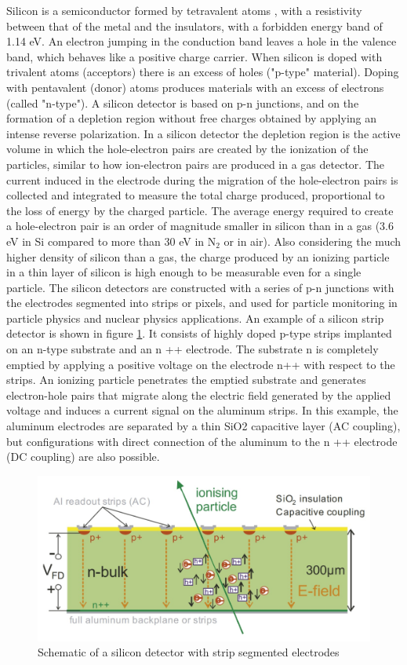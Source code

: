 \noindent Silicon is a semiconductor formed by tetravalent atoms \cite{detector}, with a resistivity between that of the metal and the insulators, with a forbidden energy band of 1.14 eV.
An electron jumping in the conduction band leaves a hole in the valence band, which behaves like a positive charge carrier.
When silicon is doped with trivalent atoms (acceptors) there is an excess of holes ("p-type" material).
Doping with pentavalent (donor) atoms produces materials with an excess of electrons (called "n-type").
\newline
A silicon detector is based on p-n junctions, and on the formation of a depletion region without free charges obtained by applying an intense reverse polarization.
In a silicon detector the depletion region is the active volume in which the hole-electron pairs are created by the ionization of the particles, similar to how ion-electron pairs are produced in a gas detector.
The current induced in the electrode during the migration of the hole-electron pairs is collected and integrated to measure the total charge produced, proportional to the loss of energy by the charged particle.
\newline
The average energy required to create a hole-electron pair is an order of magnitude smaller in silicon than in a gas (3.6 eV in Si compared to more than 30 eV in N$_2$ or in air).
Also considering the much higher density of silicon than a gas, the charge produced by an ionizing particle in a thin layer of silicon is high enough to be measurable even for a single particle.
\newline
The silicon detectors are constructed with a series of p-n junctions with the electrodes segmented into strips or pixels, and used for particle monitoring in particle physics and nuclear physics applications.
An example of a silicon strip detector is shown in figure \ref{fig:detector}. It consists of highly doped p-type strips implanted on an n-type substrate and an n ++ electrode.
The substrate n is completely emptied by applying a positive voltage on the electrode n++ with respect to the strips.
An ionizing particle penetrates the emptied substrate and generates electron-hole pairs that migrate along the electric field generated by the applied voltage and induces a current signal on the aluminum strips.
In this example, the aluminum electrodes are separated by a thin SiO2 capacitive layer (AC coupling), but configurations with direct connection of the aluminum to the n ++ electrode (DC coupling) are also possible.
\begin{figure}[H]
	\centering
	\includegraphics[width=0.7\linewidth]{IMG/ch1/Detector.PNG}
	\caption{Schematic of a silicon detector with strip segmented electrodes}
	\label{fig:detector}
\end{figure}
